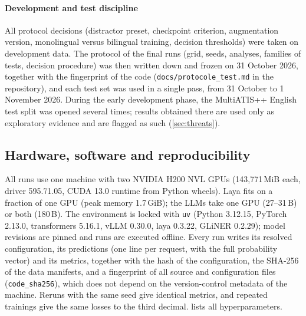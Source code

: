 \paragraph{Development and test discipline} All protocol decisions (distractor preset, checkpoint criterion, augmentation version, monolingual versus bilingual training, decision thresholds) were taken on development data. The protocol of the final runs (grid, seeds, analyses, families of tests, decision procedure) was then written down and frozen on 31 October 2026, together with the fingerprint of the code (\texttt{docs/protocole\_test.md} in the repository), and each test set was used in a single pass, from 31 October to 1 November 2026. During the early development phase, the MultiATIS++ English test split was opened several times; results obtained there are used only as exploratory evidence and are flagged as such (\cref{sec:threats}).

\subsection{Hardware, software and reproducibility}
\label{sec:repro}

All runs use one machine with two NVIDIA H200 NVL GPUs (143,771\,MiB each, driver 595.71.05, CUDA 13.0 runtime from Python wheels). Laya fits on a fraction of one GPU (peak memory 1.7\,GiB); the LLMs take one GPU (27--31\,B) or both (180\,B). The environment is locked with \texttt{uv} (Python 3.12.15, PyTorch 2.13.0, transformers 5.16.1, vLLM 0.30.0, laya 0.3.22, GLiNER 0.2.29); model revisions are pinned and runs are executed offline. Every run writes its resolved configuration, its predictions (one line per request, with the full probability vector) and its metrics, together with the hash of the configuration, the SHA-256 of the data manifests, and a fingerprint of all source and configuration files (\texttt{code\_sha256}), which does not depend on the version-control metadata of the machine. Reruns with the same seed give identical metrics, and repeated trainings give the same losses to the third decimal.  lists all hyperparameters.

